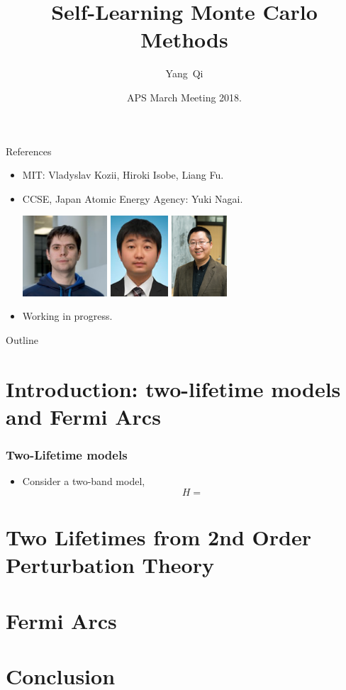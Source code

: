\documentclass[xcolor=table, 10pt, aspectratio=169]{beamer}
\title[SMLC] %
{Self-Learning Monte Carlo Methods}
\author[Y Qi] %
{Yang~Qi}
\institute[Fudan] %
{Department of Physics, Fudan University}
\date{APS March Meeting 2018.}
\begin{document}
\begin{frame}
  \titlepage
\end{frame}

\begin{frame}{References}
\begin{itemize}
\item MIT: Vladyslav Kozii, Hiroki Isobe, Liang Fu.
\item CCSE, Japan Atomic Energy Agency: Yuki Nagai.
\begin{center}
	\includegraphics[height=3cm]{../people/vlad}
	\includegraphics[height=3cm]{../people/yuki}
	\includegraphics[height=3cm]{../people/liangfu}
\end{center}
\item Working in progress.
\end{itemize}
\end{frame}

\begin{frame}{Outline}
		\tableofcontents
\end{frame}

\section{Introduction: two-lifetime models and Fermi Arcs}

\begin{frame}
\frametitle{Two-Lifetime models}
\begin{itemize}
\item Consider a two-band model,
\[H=\]
\end{itemize}
\end{frame}

\section{Two Lifetimes from 2nd Order Perturbation Theory}

\section{Fermi Arcs}

\section{Conclusion}
\end{document}
